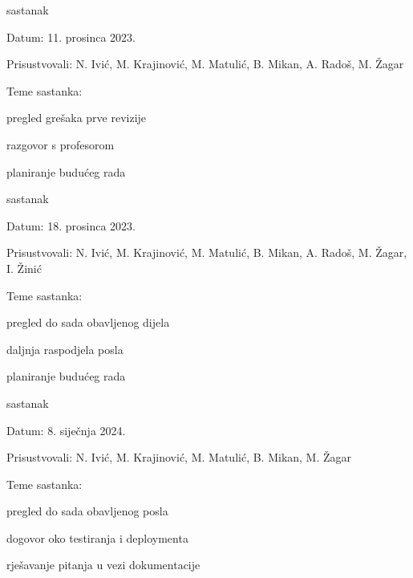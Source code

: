 \begin{packed_enum}
			\item  sastanak
			\item[] \begin{packed_item}
				\item Datum: 11. prosinca 2023.
				\item Prisustvovali: N. Ivić, M. Krajinović, M. Matulić, B. Mikan, A. Radoš, M. Žagar
				\item Teme sastanka:
				\begin{packed_item}
					\item  pregled grešaka prve revizije
					\item  razgovor s profesorom
					\item  planiranje budućeg rada
				\end{packed_item}
			\end{packed_item}

			\item  sastanak
			\item[] \begin{packed_item}
				\item Datum: 18. prosinca 2023.
				\item Prisustvovali: N. Ivić, M. Krajinović, M. Matulić, B. Mikan, A. Radoš, M. Žagar, I. Žinić
				\item Teme sastanka:
				\begin{packed_item}
					\item  pregled do sada obavljenog dijela
					\item  daljnja raspodjela posla
					\item  planiranje budućeg rada
				\end{packed_item}
			\end{packed_item}
			
			\item  sastanak
			\item[] \begin{packed_item}
				\item Datum: 8. siječnja 2024.
				\item Prisustvovali: N. Ivić, M. Krajinović, M. Matulić, B. Mikan, M. Žagar
				\item Teme sastanka:
				\begin{packed_item}
					\item  pregled do sada obavljenog posla
					\item  dogovor oko testiranja i deploymenta
					\item  rješavanje pitanja u vezi dokumentacije
				\end{packed_item}
			\end{packed_item}
			

\end{packed_enum}
